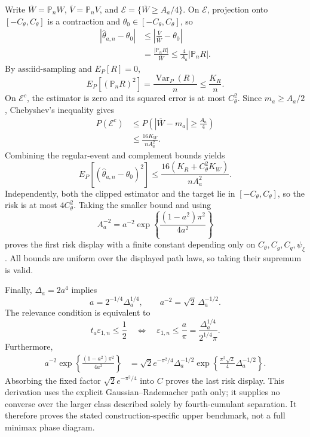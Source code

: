 Write \(\overline W=\mathbb P_nW\),
\(\overline V=\mathbb P_nV\), and
\(\mathcal E=\{\overline W\geq A_a/4\}\).  On \(\mathcal E\), projection
onto \([-C_{\theta},C_{\theta}]\) is a contraction and
\(\theta_0\in[-C_{\theta},C_{\theta}]\), so
\[
\begin{aligned}
 |\widehat\theta_{a,n}-\theta_0|
 &\leq\left|\frac{\overline V}{\overline W}-\theta_0\right|\\
 &=\frac{|\mathbb P_nR|}{\overline W}
 \leq\frac{4}{A_a}|\mathbb P_nR|.
\end{aligned}
\]
By \(\text{ass:iid-sampling}\) and \(E_P[R]=0\),
\[
 E_P[(\mathbb P_nR)^2]
 =\frac{\operatorname{Var}_P(R)}{n}
 \leq\frac{K_R}{n}.
\]
On \(\mathcal E^c\), the estimator is zero and its squared error is at most
\(C_{\theta}^2\).  Since \(m_a\geq A_a/2\), Chebyshev's inequality gives
\[
\begin{aligned}
 P(\mathcal E^c)
 &\leq P\!\left(|\overline W-m_a|\geq\frac{A_a}{4}\right)\\
 &\leq\frac{16K_W}{nA_a^2}.
\end{aligned}
\]
Combining the regular-event and complement bounds yields
\[
 E_P[(\widehat\theta_{a,n}-\theta_0)^2]
 \leq\frac{16(K_R+C_{\theta}^2K_W)}{nA_a^2}.
\]
Independently, both the clipped estimator and the target lie in
\([-C_{\theta},C_{\theta}]\), so the risk is at most
\(4C_{\theta}^2\).  Taking the smaller bound and using
\[
 A_a^{-2}
 =a^{-2}\exp\!\left\{\frac{(1-a^2)\pi^2}{4a^2}\right\}
\]
proves the first risk display with a finite constant depending only on
\(C_{\theta},C_g,C_q,\psi_{\xi}\).  All bounds are uniform over the
displayed path laws, so taking their supremum is valid.

Finally, \(\Delta_a=2a^4\) implies
\[
 a=2^{-1/4}\Delta_a^{1/4},
 \qquad
 a^{-2}=\sqrt2\,\Delta_a^{-1/2}.
\]
The relevance condition is equivalent to
\[
 t_a\varepsilon_{1,n}\leq\frac12
 \quad\Longleftrightarrow\quad
 \varepsilon_{1,n}\leq\frac{a}{\pi}
 =\frac{\Delta_a^{1/4}}{2^{1/4}\pi}.
\]
Furthermore,
\[
\begin{aligned}
 a^{-2}\exp\!\left\{\frac{(1-a^2)\pi^2}{4a^2}\right\}
 &=\sqrt2e^{-\pi^2/4}\Delta_a^{-1/2}
 \exp\!\left\{\frac{\pi^2\sqrt2}{4}\Delta_a^{-1/2}\right\}.
\end{aligned}
\]
Absorbing the fixed factor \(\sqrt2e^{-\pi^2/4}\) into \(C\) proves the
last risk display.  This derivation uses the explicit
Gaussian--Rademacher path only; it supplies no converse over the larger class
described solely by fourth-cumulant separation.  It therefore proves the
stated construction-specific upper benchmark, not a full minimax phase
diagram.